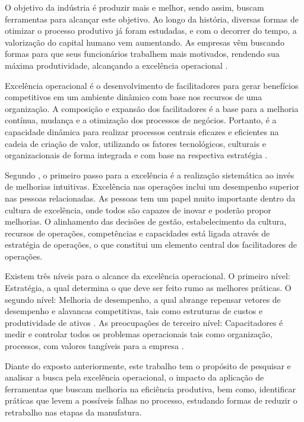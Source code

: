 \documentclass[
	12pt,
	openright,
	oneside, %
	a4paper,
	chapter=TITLE,
	section=TITLE,
	english,
	brazil %
	]{abntex2-udesc}
\begin{document}
O objetivo da indústria é produzir mais e melhor, sendo assim, buscam ferramentas
para alcançar este objetivo. Ao longo da história, diversas formas de otimizar o processo
produtivo já foram estudadas, e com o decorrer do tempo, a valorização do capital humano
vem aumentando. As empresas vêm buscando formas para que seus funcionários trabalhem
mais motivados, rendendo sua máxima produtividade, alcançando a excelência operacional
\cite{guelbert2009etal}.

Excelência operacional é o desenvolvimento de facilitadores para gerar benefícios
competitivos em um ambiente dinâmico com base nos recursos de uma organização. A
composição e expansão dos facilitadores é a base para a melhoria contínua, mudança e a
otimização dos processos de negócios. Portanto, é a capacidade dinâmica para realizar
processos centrais eficazes e eficientes na cadeia de criação de valor, utilizando os fatores
tecnológicos, culturais e organizacionais de forma integrada e com base na respectiva
estratégia \cite{jaeger2014etal}.

Segundo , o primeiro passo para a excelência é a realização sistemática
ao invés de melhorias intuitivas. Excelência nas operações inclui um desempenho superior nas
pessoas relacionadas. As pessoas tem um papel muito importante dentro da cultura de
excelência, onde todos são capazes de inovar e poderão propor melhorias. O alinhamento das
decisões de gestão, estabelecimento da cultura, recursos de operações, competências e
capacidades está ligada através de estratégia de operações, o que constitui um elemento
central dos facilitadores de operações.

Existem três níveis para o alcance da excelência operacional. O primeiro nível:
Estratégia, a qual determina o que deve ser feito rumo as melhores práticas. O segundo nível:
Melhoria de desempenho, a qual abrange repensar vetores de desempenho e alavancas
competitivas, tais como estruturas de custos e produtividade de ativos \cite{jaeger2014etal}. As
preocupações de terceiro nível: Capacitadores é medir e controlar todos os problemas
operacionais tais como organização, processos, com valores tangíveis para a empresa
\cite{jaeger2014etal}.

Diante do exposto anteriormente, este trabalho tem o propósito de pesquisar e analisar
a busca pela excelência operacional, o impacto da aplicação de ferramentas que buscam
melhoria na eficiência produtiva, bem como, identificar práticas que levem a possíveis falhas
no processo, estudando formas de reduzir o retrabalho nas etapas da manufatura.
\end{document}
